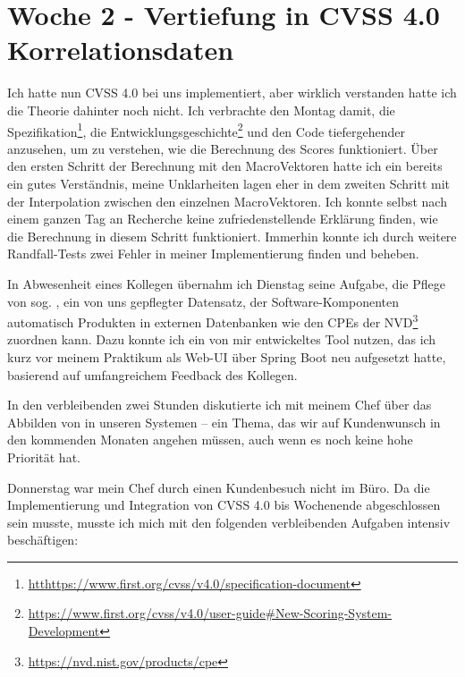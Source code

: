 \section{Woche 2 - Vertiefung in CVSS 4.0 \headerand Korrelationsdaten} \label{sec:bericht-wo-2}


\lweekdaymarginpar{\weekdayMondayLong}

Ich hatte nun CVSS 4.0 bei uns implementiert, aber wirklich verstanden hatte ich die Theorie dahinter noch nicht.
Ich verbrachte den Montag damit, die Spezifikation\footnote{\url{htthttps://www.first.org/cvss/v4.0/specification-document}},
die Entwicklungsgeschichte\footnote{\url{https://www.first.org/cvss/v4.0/user-guide\#New-Scoring-System-Development}}
und den Code tiefergehender anzusehen, um zu verstehen, wie die Berechnung des Scores funktioniert.
Über den ersten Schritt der Berechnung mit den MacroVektoren hatte ich ein bereits ein gutes Verständnis, meine Unklarheiten lagen eher in dem zweiten Schritt mit der Interpolation zwischen den einzelnen MacroVektoren.
Ich konnte selbst nach einem ganzen Tag an Recherche keine zufriedenstellende Erklärung finden, wie die Berechnung in diesem Schritt funktioniert.
Immerhin konnte ich durch weitere Randfall-Tests zwei Fehler in meiner Implementierung finden und beheben.

\sweekdaymarginpar{\weekdayTuesdayShort, \weekdayWednesdayShort}

In Abwesenheit eines Kollegen übernahm ich Dienstag seine Aufgabe, die Pflege von sog. , ein von uns gepflegter Datensatz, der Software-Komponenten automatisch Produkten in externen Datenbanken wie den CPEs der NVD\footnote{\url{https://nvd.nist.gov/products/cpe}} zuordnen kann.
Dazu konnte ich ein von mir entwickeltes Tool nutzen, das ich kurz vor meinem Praktikum als Web-UI über Spring Boot neu aufgesetzt hatte, basierend auf umfangreichem Feedback des Kollegen.

In den verbleibenden zwei Stunden diskutierte ich mit meinem Chef über das Abbilden von  in unseren Systemen – ein Thema, das wir auf Kundenwunsch in den kommenden Monaten angehen müssen, auch wenn es noch keine hohe Priorität hat.

\sweekdaymarginpar{\weekdayThursdayLong}

Donnerstag war mein Chef durch einen Kundenbesuch nicht im Büro.
Da die Implementierung und Integration von CVSS 4.0 bis Wochenende abgeschlossen sein musste, musste ich mich mit den folgenden verbleibenden Aufgaben intensiv beschäftigen:


